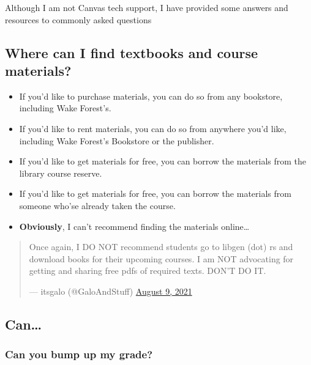 Although I am not Canvas tech support, I have provided some answers and resources to commonly asked questions

\hypertarget{where-can-i-find-textbooks-and-course-materials}{%
\subsection{Where can I find textbooks and course materials?}\label{where-can-i-find-textbooks-and-course-materials}}

\begin{itemize}
\tightlist
\item
  If you'd like to purchase materials, you can do so from any bookstore, including Wake Forest's.
\item
  If you'd like to rent materials, you can do so from anywhere you'd like, including Wake Forest's Bookstore or the publisher.
\item
  If you'd like to get materials for free, you can borrow the materials from the library course reserve.
\item
  If you'd like to get materials for free, you can borrow the materials from someone who'se already taken the course.
\item
  \textbf{Obviously}, I can't recommend finding the materials online\ldots{}
\end{itemize}

\begin{quote}
Once again, I DO NOT recommend students go to libgen (dot) rs and
download books for their upcoming courses. I am NOT advocating for
getting and sharing free pdfs of required texts. DON'T DO IT.

\begin{flushright}--- itsgalo (@GaloAndStuff) \href{https://twitter.com/GaloAndStuff/status/1424818560417902604}{August 9,
2021}\end{flushright}
\end{quote}

\hypertarget{can}{%
\subsection{Can\ldots{}}\label{can}}

\hypertarget{can-you-bump-up-my-grade}{%
\subsubsection{Can you bump up my grade?}\label{can-you-bump-up-my-grade}}

